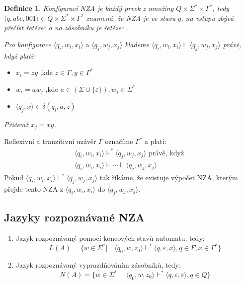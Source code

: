 \documentclass[10pt, a4paper, titlepage]{article}
\theoremstyle{note}
\newtheorem{definice}{Definice}
\begin{document}
\begin{definice}
Konfigurac\'i NZA je každ\'y prvek z množiny $Q \times \Sigma^* \times \Gamma^*$, tedy
$\langle q, abc, 001 \rangle \in Q \times \Sigma^* \times \Gamma^*$ znamená, že NZA je ve stavu $q$, na vstupu
zbývá přečíst řetězec  a na zásobníku je řetězec .

Pro konfigurace $\langle q_i, w_i, x_i \rangle \text{ a } \langle q_j, w_j, x_j \rangle$ klademe 
$\langle q_i, w_i, x_i \rangle \vdash \langle q_j, w_j, x_j \rangle$ právě, když platí:
\begin{itemize}
\item
$x_i = zy \text{ ,kde } z \in \Gamma, y \in \Gamma^*$

\item
$w_i = aw_j \text{ ,kde } a \in (\Sigma \cup \lbrace \varepsilon \rbrace), w_j \in \Sigma^*$

\item
$\langle q_j, x \rangle \in \delta(q_i, a, z)$
\end{itemize}
Přičemž $x_j = xy$.
\end{definice}

Reflexivní a tranzitivní uzávěr $\Gamma$ označíme $\Gamma^*$ a platí:
\begin{gather*}
\langle q_i, w_i, x_i \rangle \vdash^* \langle q_j, w_j, x_j \rangle \text{ právě, když} \\
\langle q_i, w_i, x_i \rangle \vdash \cdots \vdash \langle q_j, w_j, x_j \rangle
\end{gather*}
Pokud $\langle q_i, w_i, x_i \rangle \vdash^* \langle q_j, w_j, x_j \rangle$ tak říkáme, že existuje výpočet
NZA, kterým přejde tento NZA z $\langle q_i, w_i, x_i \rangle \text{ do } \langle q_j, w_j, x_j \rangle$.

\subsection{Jazyky rozpoznávané NZA}
\begin{enumerate}
\item
Jazyk rozpoznávaný pomocí koncových stavů automatu, tedy:
$$
L(A) = \lbrace w \in \Sigma^* | \quad \langle q_0, w, z_0 \rangle \vdash^* \langle q, \varepsilon, x \rangle, q \in F, x \in \Gamma^* \rbrace
$$

\item
Jazyk rozpoznávaný vyprazdňováním zásobníků, tedy:
$$
N(A) = \lbrace w \in \Sigma^* | \quad \langle q_0, w, z_0 \rangle \vdash^* \langle q, \varepsilon, \varepsilon \rangle, q \in Q \rbrace
$$
\end{enumerate}
\end{document}
